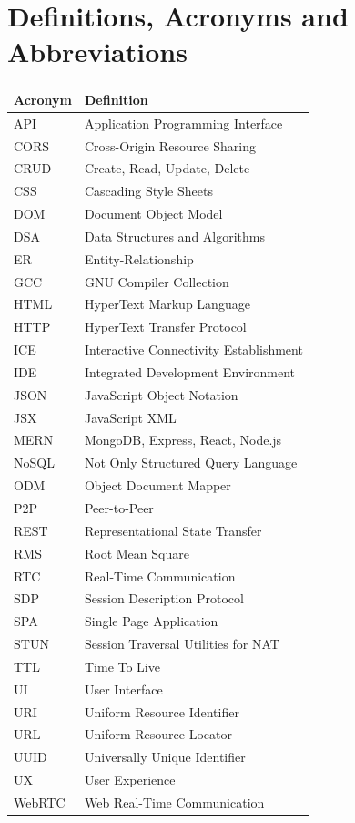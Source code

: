 \chapter*{Definitions, Acronyms and Abbreviations}

\begin{reporttable}
\begin{tabular}{@{} l p{10cm} @{}}
\toprule
\textbf{Acronym} & \textbf{Definition} \\
\midrule
API & Application Programming Interface \\
CORS & Cross-Origin Resource Sharing \\
CRUD & Create, Read, Update, Delete \\
CSS & Cascading Style Sheets \\
DOM & Document Object Model \\
DSA & Data Structures and Algorithms \\
ER & Entity-Relationship \\
GCC & GNU Compiler Collection \\
HTML & HyperText Markup Language \\
HTTP & HyperText Transfer Protocol \\
ICE & Interactive Connectivity Establishment \\
IDE & Integrated Development Environment \\
JSON & JavaScript Object Notation \\
JSX & JavaScript XML \\
MERN & MongoDB, Express, React, Node.js \\
NoSQL & Not Only Structured Query Language \\
ODM & Object Document Mapper \\
P2P & Peer-to-Peer \\
REST & Representational State Transfer \\
RMS & Root Mean Square \\
RTC & Real-Time Communication \\
SDP & Session Description Protocol \\
SPA & Single Page Application \\
STUN & Session Traversal Utilities for NAT \\
TTL & Time To Live \\
UI & User Interface \\
URI & Uniform Resource Identifier \\
URL & Uniform Resource Locator \\
UUID & Universally Unique Identifier \\
UX & User Experience \\
WebRTC & Web Real-Time Communication \\
\bottomrule
\end{tabular}
\end{reporttable}

\clearpage

